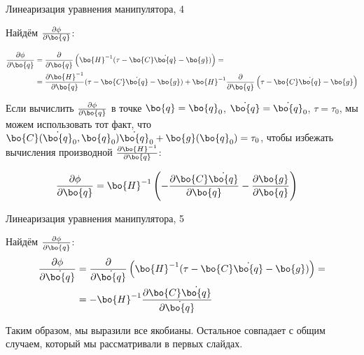 \documentclass{beamer}
\begin{document}
\begin{frame}{Линеаризация уравнения манипулятора, 4}
	\begin{flushleft}
		
		Найдём $\frac{\partial \phi}{\partial \bo{q}}$:
		
		\begin{align}
			\frac{\partial \phi}{\partial \bo{q}}
			&=
			\frac{\partial }{\partial \bo{q}} \left(\bo{H}^{-1} (\tau - \bo{C} \dot{\bo{q}} - \bo{g} ) \right)
			= \\
			&=
			\frac{\partial \bo{H}^{-1}}{\partial \bo{q}} (\tau - \bo{C} \dot{\bo{q}} - \bo{g} )
			+
			\bo{H}^{-1} \frac{\partial }{\partial \bo{q}} \left( \tau - \bo{C} \dot{\bo{q}} - \bo{g} \right)
		\end{align}
		
		Если вычислить $\frac{\partial \phi}{\partial \bo{q}}$ в точке $\bo{q} = \bo{q}_0$, $\dot{\bo{q}} = \dot{\bo{q}}_0$, $\tau = \tau_0$, мы можем использовать тот факт, что $\bo{C}(\dot{\bo{q}}_0, \bo{q}_0) \dot{\bo{q}}_0 + \bo{g}(\bo{q}_0) = \tau_0$, чтобы избежать вычисления производной $\frac{\partial \bo{H}^{-1}}{\partial \bo{q}}$:
		
		\begin{align}
			\frac{\partial \phi}{\partial \bo{q}}
			&=
			\bo{H}^{-1} \left( - \frac{\partial \bo{C}\dot{\bo{q}}}{\partial \bo{q}}  - \frac{\partial \bo{g}}{\partial \bo{q}} \right)
		\end{align}
		
	\end{flushleft}
\end{frame}




\begin{frame}{Линеаризация уравнения манипулятора, 5}
	\begin{flushleft}
		
		Найдём $\frac{\partial \phi}{\partial \dot{\bo{q}}}$:
		\begin{align}
			\frac{\partial \phi}{\partial \dot{\bo{q}}}
			&=
			\frac{\partial }{\partial \dot{\bo{q}}} \left(\bo{H}^{-1} (\tau - \bo{C} \dot{\bo{q}} - \bo{g} ) \right)
			= \\
			&=
			-\bo{H}^{-1}\frac{\partial \bo{C} \dot{\bo{q}}}{\partial \dot{\bo{q}}}
		\end{align}
		
		Таким образом, мы выразили все якобианы. Остальное совпадает с общим случаем, который мы рассматривали в первых слайдах.
		
	\end{flushleft}
\end{frame}





\myqrframe
\end{document}
